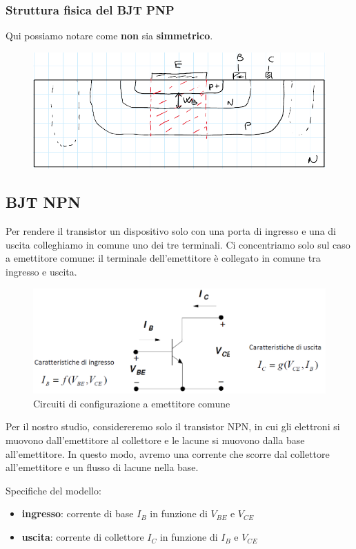 \documentclass[11pt,a4paper,]{article}
\begin{document}
\subsubsection{Struttura fisica del BJT PNP}
Qui possiamo notare come \textbf{non} sia \textbf{simmetrico}.
\begin{figure}[H]
    \centering
    \includegraphics[width=0.5\linewidth]{img/fisic bjt.png}
\end{figure}
\subsection{BJT NPN}
Per rendere il transistor un dispositivo solo con una porta di ingresso e una di uscita colleghiamo in comune uno dei tre terminali.
Ci concentriamo solo sul caso a emettitore comune: il terminale dell'emettitore è collegato in comune tra ingresso e uscita.
\begin{figure}
    \centering
    \includegraphics[width=0.5\linewidth]{img/bjt npn.png}
    \caption{Circuiti di configurazione a emettitore comune}
\end{figure}
Per il nostro studio, considereremo solo il transistor NPN, in cui gli elettroni si muovono dall'emettitore al collettore e le lacune si muovono dalla base all'emettitore. In questo modo, avremo una corrente che scorre dal collettore all'emettitore e un flusso di lacune nella base.

Specifiche del modello:
\begin{itemize}
    \item \textbf{ingresso}: corrente di base $I_B$ in funzione di $V_{BE}$ e $V_{CE}$
    \item \textbf{uscita}: corrente di collettore $I_C$ in funzione di $I_B$ e $V_{CE}$
\end{itemize}
\end{document}
